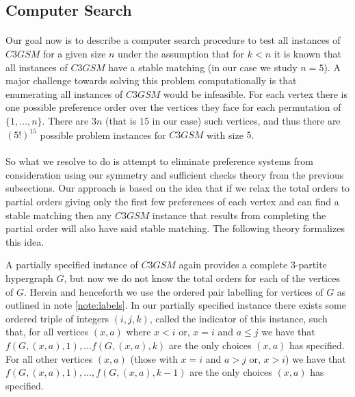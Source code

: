 \subsection{Computer Search}\label{sec:computersearch}
\paragraph{}
Our goal now is to describe a computer search procedure to test all instances of $C3GSM$ for a given size $n$ under the assumption that for $k<n$ it is known that all instances of $C3GSM$ have a stable matching (in our case we study $n=5$). A major challenge towards solving this problem computationally is that enumerating all instances of $C3GSM$ would be infeasible. For each vertex there is one possible preference order over the vertices they face for each permutation of $\{1,\dots,n\}$. There are $3n$ (that is $15$ in our case) such vertices, and thus there are $(5!)^{15}$ possible problem instances for $C3GSM$ with size $5$. 
\paragraph{}
So what we resolve to do is attempt to eliminate preference systems from consideration using our symmetry and sufficient checks theory from the previous subsections. Our approach is based on the idea that if we relax the total orders to partial orders giving only the first few preferences of each vertex and can find a stable matching then any $C3GSM$ instance that results from completing the partial order will also have said stable matching. The following theory formalizes this idea.
\begin{definition}
A partially specified instance of $C3GSM$ again provides a complete $3$-partite hypergraph $G$, but now we do not know the total orders for each of the vertices of $G$. Herein and henceforth we use the ordered pair labelling for vertices of $G$ as outlined in note \ref{note:labels}. In our partially specified instance there exists some ordered triple of integers $(i,j,k)$, called the indicator of this instance, such that, for all vertices $(x,a)$ where $x<i$ or, $x=i$ and $a\leq j$ we have that $f(G,(x,a), 1), \dots f(G,(x,a), k)$ are the only choices $(x,a)$ has specified. For all other vertices $(x,a)$ (those with $x=i$ and $a > j$ or, $x>i$) we have that $f(G,(x,a), 1), \dots, f(G,(x,a),k-1)$ are the only choices $(x,a)$ has specified.
\end{definition}
